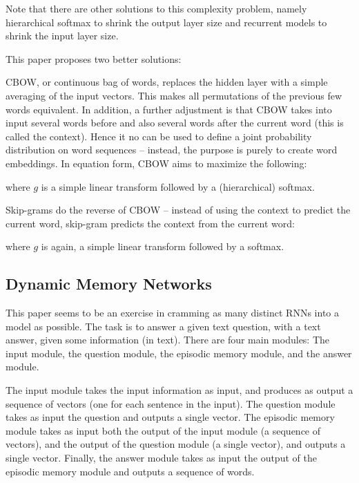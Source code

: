 \documentclass[12pt]{article}
\begin{document}
Note that there are other solutions to this complexity problem, namely hierarchical softmax to shrink the output layer size and recurrent models to shrink the input layer size.

This paper proposes two better solutions:

CBOW, or continuous bag of words, replaces the hidden layer with a simple averaging of the input vectors. This makes all permutations of the previous few words equivalent. In addition, a further adjustment is that CBOW takes into input several words before and also several words after the current word (this is called the context). Hence it no can be used to define a joint probability distribution on word sequences -- instead, the purpose is purely to create word embeddings. In equation form, CBOW aims to maximize the following:


where $g$ is a simple linear transform followed by a (hierarchical) softmax.

Skip-grams do the reverse of CBOW -- instead of using the context to predict the current word, skip-gram predicts the context from the current word:



where $g$ is again, a simple linear transform followed by a softmax. 

\subsection{Dynamic Memory Networks \cite{DynamicMemory}}

This paper seems to be an exercise in cramming as many distinct RNNs into a model as possible. The task is to answer a given text question, with a text answer, given some information (in text). There are four main modules: The input module, the question module, the episodic memory module, and the answer module.

The input module takes the input information as input, and produces as output a sequence of vectors (one for each sentence in the input). The question module takes as input the question and outputs a single vector. The episodic memory module takes as input both the output of the input module (a sequence of vectors), and the output of the question module (a single vector), and outputs a single vector. Finally, the answer module takes as input the output of the episodic memory module and outputs a sequence of words.
\end{document}
